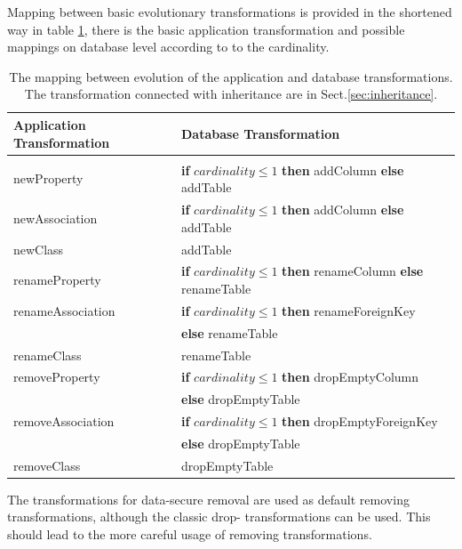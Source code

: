 \documentclass[runningheads]{comsis}
\begin{document}
Mapping between basic evolutionary transformations is provided in the shortened way in table \ref{tab:sw-basic-evolution}, there is the basic application transformation and possible mappings on database level according to to the cardinality.  
\begin{table}
	\caption{The mapping between evolution of the application and database transformations. The  transformation connected with inheritance are in Sect.\ref{sec:inheritance}. }
	\label{tab:sw-basic-evolution}
\centering
	\begin{tabular}{ll}
		\hline
	Application Transformation & Database Transformation \\
	\hline
	\\[-2ex] 
	newProperty & \textbf{if} $cardinality \leq 1$ \textbf{then} addColumn \textbf{else} addTable \\ 

	newAssociation & \textbf{if} $cardinality \leq 1$ \textbf{then} addColumn  \textbf{else} addTable \\

	newClass & addTable \\
	renameProperty & \textbf{if} $cardinality \leq 1$ \textbf{then}  renameColumn  \textbf{else} renameTable \\

	renameAssociation & \textbf{if} $cardinality \leq 1$ \textbf{then} renameForeignKey \\ & \hspace{1in} \textbf{else} renameTable \\
	
	renameClass & renameTable \\
	removeProperty & \textbf{if} $cardinality \leq 1$ \textbf{then} dropEmptyColumn  \\ & \hspace{1in}\textbf{else} dropEmptyTable \\
	
	removeAssociation & \textbf{if} $cardinality \leq 1$ \textbf{then}  dropEmptyForeignKey \\ & \hspace{1in} \textbf{else} dropEmptyTable \\
	removeClass & dropEmptyTable\\
	\hline
	\end{tabular}
\end{table}
The transformations for data-secure removal are used as default removing transformations, although the classic drop- transformations can be used. This should lead to the more careful usage of removing transformations.
\end{document}
